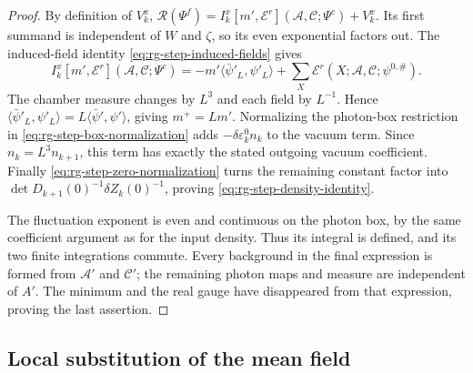 \documentclass[11pt,letterpaper,reqno]{amsart}
\begin{document}
\begin{proof}
By definition of $V_k^x$,
$\mathcal R(\Psi^f)=
I_k^x[m',\mathscr E^r](\mathscr A,\mathscr C;\Psi^c)+V_k^x$.
Its first summand is independent of $W$ and $\zeta$,
so its even exponential factors out.
The induced-field identity
\eqref{eq:rg-step-induced-fields} gives
\[
 I_k^x[m',\mathscr E^r](\mathscr A,\mathscr C;\Psi^c)
      =-m'\langle\bar\psi'_L,\psi'_L\rangle
                 +\sum_X\mathscr E^r(X;\mathscr A,\mathscr C;\psi^{0,\#}).
\]
The chamber measure changes by $L^3$ and each field
by $L^{-1}$. Hence
$\langle\bar\psi'_L,\psi'_L\rangle
=L\langle\bar\psi',\psi'\rangle$, giving $m^+=Lm'$.
Normalizing the photon-box restriction in
\eqref{eq:rg-step-box-normalization} adds
$-\delta\varepsilon_k^0 n_k$ to the vacuum term.
Since $n_k=L^3n_{k+1}$, this term has exactly
the stated outgoing vacuum coefficient.
Finally \eqref{eq:rg-step-zero-normalization}
turns the remaining constant factor into
$\det D_{k+1}(0)^{-1}\delta Z_k(0)^{-1}$,
proving \eqref{eq:rg-step-density-identity}.

The fluctuation exponent is even and continuous
on the photon box, by the same coefficient argument
as for the input density. Thus its integral is defined,
and its two finite integrations commute.
Every background in the final expression is formed
from $\mathscr A'$ and $\mathscr C'$; the remaining
photon maps and measure are independent of $A'$.
The minimum and the real gauge have disappeared
from that expression, proving the last assertion.
\end{proof}

\subsection{Local substitution of the mean field}
\label{subsec:rg-step-local-substitution}
\end{document}
